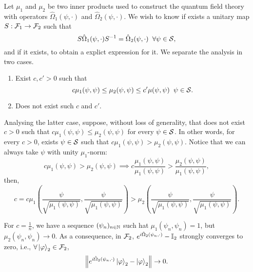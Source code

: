 Let \(\mu_1\) and \(\mu_2\) be two inner products used to construct the quantum field theory with operators \(\hat{\Omega}_1(\psi,\cdot)\) and \(\hat{\Omega}_2(\psi,\cdot)\). We wish to know if exists a unitary map \(S:{\mathcal{F}}_1\to{\mathcal{F}}_2\) such that
\begin{equation}
    S\hat{\Omega}_1(\psi,\cdot)S^{-1}=\hat{\Omega}_2(\psi,\cdot)\;\;\forall\psi\in{\mathcal{S}},
\end{equation}
and if it exists, to obtain a explict expression for it. We separate the analysis in two cases.
\begin{enumerate}
    \item Exist \(c,c'>0\) such that
    \begin{equation}
        c\mu_1(\psi,\psi)\leq \mu_2(\psi,\psi)\leq c'\mu(\psi,\psi)\;\;\psi\in{\mathcal{S}}.
    \end{equation}

    \item Does not exist such \(c\) and \(c'\).
\end{enumerate}

Analysing the latter case, suppose, without loss of generality, that does not exist \(c>0\) such that \(c\mu_1(\psi,\psi)\leq\mu_2(\psi,\psi)\) for every \(\psi\in{\mathcal{S}}\). In other words, for every \(c>0\), exists \(\psi\in{\mathcal{S}}\) such that \(c\mu_1(\psi,\psi)>\mu_2(\psi,\psi)\). Notice that we can always take \(\psi\) with unity \(\mu_1\)-norm:
\begin{equation}
    c\mu_1(\psi,\psi)>\mu_2(\psi,\psi)\implies c\frac{\mu_1(\psi,\psi)}{\mu_1(\psi,\psi)}>\frac{\mu_2(\psi,\psi)}{\mu_1(\psi,\psi)},
\end{equation}
then,
\begin{equation}
    c=c\mu_1\left(\frac{\psi}{\sqrt{\mu_1(\psi,\psi)}},\frac{\psi}{\sqrt{\mu_1(\psi,\psi)}}\right)>\mu_2\left(\frac{\psi}{\sqrt{\mu_1(\psi,\psi)}},\frac{\psi}{\sqrt{\mu_1(\psi,\psi)}}\right).
\end{equation}

For \(c=\frac{1}{n}\), we have a sequence \((\psi_n)_{n\in{\mathbb{N}}}\) such hat \(\mu_1(\psi_n,\psi_n)=1\), but \(\mu_2(\psi_n,\psi_n)\to0\). As a consequence, in \({\mathcal{F}}_2\), \(e^{i\hat{\Omega}_2(\psi_n,\cdot)}-{\mathbb{I}}_2\) strongly converges to zero, i.e., \(\forall\ket{\varphi}_2\in{\mathcal{F}}_2\),
\begin{equation}
    \left\lVert e^{i\hat{\Omega}_2(\psi_n,\cdot)} \ket{\varphi}_2-\ket{\varphi}_2\right\rVert\to 0.
\end{equation}

